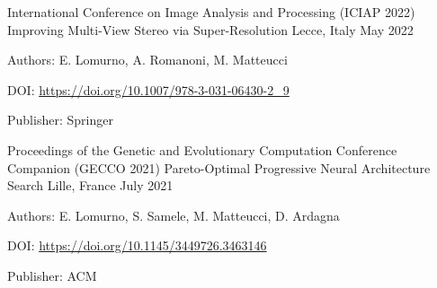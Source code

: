 \begin{cventries}
    \vspace{2mm}
    \cventry
        {International Conference on Image Analysis and Processing (ICIAP 2022)}
        {Improving Multi-View Stereo via Super-Resolution}
        {Lecce, Italy}
        {May 2022}
        {
        \begin{cvitems}
            \item {Authors: E. Lomurno, A. Romanoni, M. Matteucci}
            \item {DOI: \url{https://doi.org/10.1007/978-3-031-06430-2_9}}
            \item {Publisher: Springer}
        \end{cvitems}
        }

    \vspace{2mm}
    \cventry
        {Proceedings of the Genetic and Evolutionary Computation Conference Companion (GECCO 2021)}
        {Pareto-Optimal Progressive Neural Architecture Search}
        {Lille, France}
        {July 2021}
        {
        \begin{cvitems}
            \item {Authors: E. Lomurno, S. Samele, M. Matteucci, D. Ardagna}
            \item {DOI: \url{https://doi.org/10.1145/3449726.3463146}}
            \item {Publisher: ACM}
        \end{cvitems}
        }

\end{cventries}
